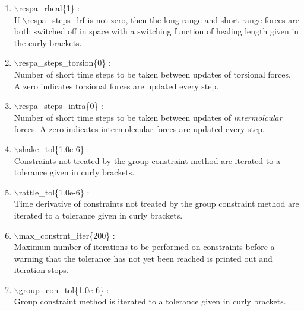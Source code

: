 \documentclass[12pt]{article}
\begin{document}
\begin{itemize}
\begin{enumerate}
 \vspace{0.15in} \Large
 \item   $\backslash$respa\_rheal\{1\} : \\
   \large
    If $\backslash$respa\_steps\_lrf is not zero, then the long range 
    and short range forces are both switched off in space with a switching
    function of healing length given in the curly brackets.

 \vspace{0.15in} \Large
 \item   $\backslash$respa\_steps\_torsion\{0\} : \\
   \large
    Number of short time steps to be taken between updates of torsional
    forces.  A zero indicates torsional forces are updated every step.

 \vspace{0.15in} \Large
  \item   $\backslash$respa\_steps\_intra\{0\} : \\
   \large
    Number of short time steps to be taken between updates of 
    {\it intermolcular} forces.  A zero indicates intermolecular forces are 
    updated every step.

 \vspace{0.15in} \Large
 \item   $\backslash$shake\_tol\{1.0e-6\} : \\
    \large
     Constraints not treated by the group constraint method are iterated to a
     tolerance given in curly brackets.


 \vspace{0.15in} \Large
 \item   $\backslash$rattle\_tol\{1.0e-6\} : \\
    \large
      Time derivative of constraints not treated by the group constraint 
      method are iterated to a tolerance given in curly brackets.


 \vspace{0.15in} \Large
 \item   $\backslash$max\_constrnt\_iter\{200\} : \\
    \large
     Maximum number of iterations to be performed on constraints before a 
     warning that the tolerance has not yet been reached is printed out and 
     iteration stops.

 \vspace{0.15in} \Large
 \item   $\backslash$group\_con\_tol\{1.0e-6\} : \\
    \large
     Group constraint method is iterated to a tolerance given in curly 
     brackets.


\end{enumerate}
\end{itemize}
\end{document}
